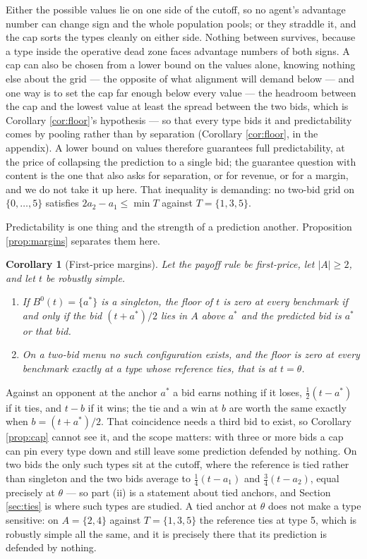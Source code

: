 \documentclass[12pt]{article}
\newtheorem{corollary}{Corollary}
\theoremstyle{definition}
\begin{document}
Either the possible values lie on one side of the cutoff, so no agent's advantage number can change sign and the whole population pools; or they straddle it, and the cap sorts the types cleanly on either side. Nothing between survives, because a type inside the operative dead zone faces advantage numbers of both signs. A cap can also be chosen from a lower bound on the values alone, knowing nothing else about the grid --- the opposite of what alignment will demand below --- and one way is to set the cap far enough below every value --- the headroom between the cap and the lowest value at least the spread between the two bids, which is Corollary \ref{cor:floor}'s hypothesis --- so that every type bids it and predictability comes by pooling rather than by separation (Corollary \ref{cor:floor}, in the appendix). A lower bound on values therefore guarantees full predictability, at the price of collapsing the prediction to a single bid; the guarantee question with content is the one that also asks for separation, or for revenue, or for a margin, and we do not take it up here. That inequality is demanding: no two-bid grid on $\{0,\dots,5\}$ satisfies $2a_2 - a_1 \le \min T$ against $T = \{1,3,5\}$.

Predictability is one thing and the strength of a prediction another. Proposition \ref{prop:margins} separates them here.

\begin{corollary}[First-price margins]\label{cor:fpmargins}
Let the payoff rule be first-price, let $|A| \ge 2$, and let $t$ be robustly simple.
\begin{enumerate}
\item[i.] If $B^0(t) = \{a^*\}$ is a singleton, the floor of $t$ is zero at every benchmark if and only if the bid $(t + a^*)/2$ lies in $A$ above $a^*$ and the predicted bid is $a^*$ or that bid.
\item[ii.] On a two-bid menu no such configuration exists, and the floor is zero at every benchmark exactly at a type whose reference ties, that is at $t = \theta$.
\end{enumerate}
\end{corollary}

Against an opponent at the anchor $a^*$ a bid earns nothing if it loses, $\tfrac12(t - a^*)$ if it ties, and $t - b$ if it wins; the tie and a win at $b$ are worth the same exactly when $b = (t + a^*)/2$. That coincidence needs a third bid to exist, so Corollary \ref{prop:cap} cannot see it, and the scope matters: with three or more bids a cap can pin every type down and still leave some prediction defended by nothing. On two bids the only such types sit at the cutoff, where the reference is tied rather than singleton and the two bids average to $\tfrac14 (t - a_1)$ and $\tfrac34 (t - a_2)$, equal precisely at $\theta$ --- so part (ii) is a statement about tied anchors, and Section \ref{sec:ties} is where such types are studied. A tied anchor at $\theta$ does not make a type sensitive: on $A = \{2,4\}$ against $T = \{1,3,5\}$ the reference ties at type 5, which is robustly simple all the same, and it is precisely there that its prediction is defended by nothing.
\end{document}
